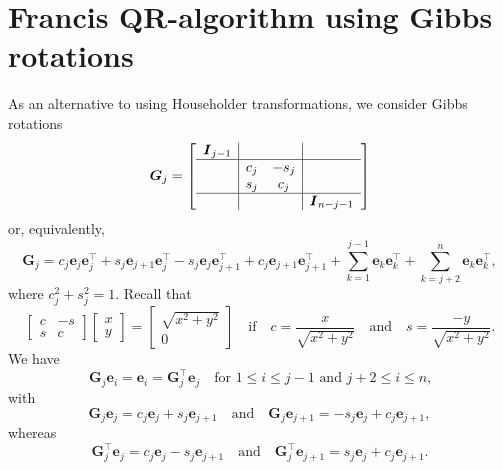 \documentclass[12pt,a4paper]{article}
\newcommand{\bs}[1]{\boldsymbol{#1}}
\begin{document}
\section{Francis QR-algorithm using Gibbs rotations}
As an alternative to using Householder transformations, we consider Gibbs
rotations
\[
\bs{G}_j=\left[\begin{array}{c|cc|c}
\bs{I}_{j-1}&   &    & \\
\hline
            &c_j&-s_j& \\
		    &s_j& c_j& \\
\hline
            &   &    &\bs{I}_{n-j-1}\end{array}\right]
\]
or, equivalently,
\[
\bs{G}_j=c_j\bs{e}_j\bs{e}_j^\top+s_j\bs{e}_{j+1}\bs{e}_j^\top
	-s_j\bs{e}_j\bs{e}_{j+1}^\top+c_j\bs{e}_{j+1}\bs{e}_{j+1}^\top
	+\sum_{k=1}^{j-1}\bs{e}_k\bs{e}_k^\top
	+\sum_{k=j+2}^n\bs{e}_k\bs{e}_k^\top,
\]
where $c_j^2+s_j^2=1$.  Recall that
\[
\begin{bmatrix}c&-s\\ s&c \end{bmatrix}\begin{bmatrix}x\\y \end{bmatrix}
	=\begin{bmatrix}\sqrt{x^2+y^2}\\0\end{bmatrix}
\quad\text{if}\quad
c=\frac{x}{\sqrt{x^2+y^2}}\quad\text{and}\quad
s=\frac{-y}{\sqrt{x^2+y^2}}.
\]
We have
\[
\bs{G}_j\bs{e}_i=\bs{e}_i=\bs{G}_j^\top\bs{e}_j
	\quad\text{for $1\le i\le j-1$ and $j+2\le i\le n$,}
\]
with
\[
\bs{G}_j\bs{e}_j=c_j\bs{e}_j+s_j\bs{e}_{j+1}
\quad\text{and}\quad
\bs{G}_j\bs{e}_{j+1}=-s_j\bs{e}_j+c_j\bs{e}_{j+1},
\]
whereas
\[
\bs{G}_j^\top\bs{e}_j=c_j\bs{e}_j-s_j\bs{e}_{j+1}
\quad\text{and}\quad
\bs{G}_j^\top\bs{e}_{j+1}=s_j\bs{e}_j+c_j\bs{e}_{j+1}.
\]
\end{document}
